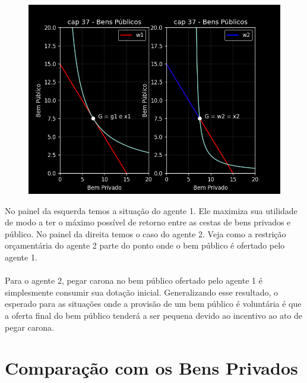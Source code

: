 \documentclass[a4paper,11pt,oneside]{book}
\theoremstyle{definition}
\theoremstyle{break}
\begin{document}
\begin{figure}[H]
	\centering
	\includegraphics[scale=0.5]{cap37_6-problema_carona.png}
\end{figure}

No painel da esquerda temos a situação do agente 1. Ele maximiza sua utilidade de modo a ter o máximo possível de retorno entre as cestas de bens privados e público. No painel da direita temos o caso do agente 2. Veja como a restrição orçamentária do agente 2 parte do ponto onde o bem público é ofertado pelo agente 1.
\\~\\
Para o agente 2, pegar carona no bem público ofertado pelo agente 1 é simplesmente consumir sua dotação inicial. Generalizando esse resultado, o esperado para as situações onde a provisão de um bem público é voluntária é que a oferta final do bem público tenderá a ser pequena devido ao incentivo ao ato de pegar carona.

\section{Comparação com os Bens Privados}
\end{document}
